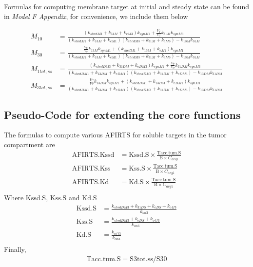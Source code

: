 Formulas for computing membrane target at initial and steady state can be found in 
\emph{Model F Appendix}, for convenience, we include them below

\newcommand{\Det}{(k_{shedM1} + k_{13M} + k_{eM1})(k_{shedM3} + k_{31M} + k_{eM3}) - k_{13M}k_{31M}}

\newcommand{\DetSS}{(k_{shedDM1} + k_{13DM} + k_{eDM1})(k_{shedDM3} + k_{31DM} + k_{eDM3})
- k_{13DM}k_{31DM}}
\begin{align*}
    M_{10} & = \frac{(k_{shedM3} + k_{31M} + k_{eM3})k_{synM1} + \frac{V_T}{V_C}k_{31M}k_{synM3}}
                    {\Det} \\
    M_{30} & = \frac{\frac{V_C}{V_T}k_{13M}k_{synM1} + (k_{shedM1} + k_{13M} + k_{eM1})k_{synM1}}
                    {\Det} \\
    M_{1tot,ss} & = \frac{(k_{shedDM3} + k_{31DM} + k_{eDM3})k_{synM1} + 
                            \frac{V_T}{V_C}k_{31DM}k_{synM3}}
                    {\DetSS} \\
    M_{3tot,ss} & = \frac{\frac{V_C}{V_T}k_{13DM}k_{synM1} + 
                            (k_{shedDM1} + k_{13DM} + k_{eDM1})k_{synM1}}
                    {\DetSS}
\end{align*}


\subsection{Pseudo-Code for extending the core functions}
The formulas to compute various AFIRTS for soluble targets in the tumor compartment are 
\begin{align}
    \text{AFIRTS.Kssd} & = \text{Kssd.S}\times \frac{\text{Tacc.tum.S}}{\text{B}\times C_{avg1}} \\
    \text{AFIRTS.Kss}  & = \text{Kss.S}\times \frac{\text{Tacc.tum.S}}{\text{B}\times C_{avg1}} \\
    \text{AFIRTS.Kd}   & = \text{Kd.S}\times \frac{\text{Tacc.tum.S}}{\text{B}\times C_{avg1}} \\
\end{align}
Where $\text{Kssd.S}$, $\text{Kss.S}$ and $\text{Kd.S}$
\begin{align}
    \text{Kssd.S} & = \frac{k_{shedDM3} + k_{31DS} + k_{eDS} + k_{off3}}{k_{on3}} \\
    \text{Kss.S}  & = \frac{k_{shedDM3} + k_{eDS} + k_{off3}}{k_{on3}} \\
    \text{Kd.S}   & = \frac{k_{off3}}{k_{on3}} \\
\end{align}
 Finally,
\begin{align}
    \text{Tacc.tum.S} = \text{S3tot.ss} / \text{S30}
\end{align}


